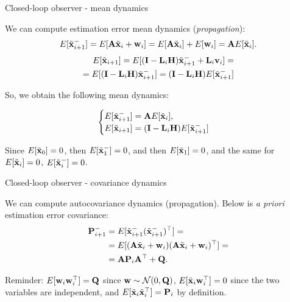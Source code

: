 \documentclass{beamer}
\begin{document}
\begin{frame}{Closed-loop observer - mean dynamics}
	\begin{flushleft}
		
		We can compute estimation error mean dynamics (\emph{propagation}):
				\begin{align*}
		E[\Tilde{\mathbf{x}}_{i+1}^-] = 
		E[\mathbf{A} \Tilde{\mathbf{x}}_i + \mathbf{w}_i] = 
		E[\mathbf{A} \Tilde{\mathbf{x}}_i] + E[\mathbf{w}_i]  =
		\mathbf{A}E[\Tilde{\mathbf{x}}_i].
				\end{align*}	
				\begin{align*}
		E[\Tilde{\mathbf{x}}_{i+1}] = 
		E[(\mathbf{I} - \mathbf{L}_i \mathbf{H}) \Tilde{\mathbf{x}}_{i+1}^- + \mathbf{L}_i\mathbf{v}_i] =\\
		=E[(\mathbf{I} - \mathbf{L}_i \mathbf{H}) \Tilde{\mathbf{x}}_{i+1}^-]
		= 
		(\mathbf{I} - \mathbf{L}_i \mathbf{H}) E[\Tilde{\mathbf{x}}_{i+1}^-]
				\end{align*}				
		
		So, we obtain the following mean dynamics:
		
				\begin{equation}
						\begin{cases}
								E[\Tilde{\mathbf{x}}_{i+1}^-] = \mathbf{A} E[\Tilde{\mathbf{x}}_i], \\
								E[\Tilde{\mathbf{x}}_{i+1}] = (\mathbf{I} - \mathbf{L}_i \mathbf{H}) E[\Tilde{\mathbf{x}}_{i+1}^-]
							\end{cases}
					\end{equation}		
		
		Since $E[\Tilde{\mathbf{x}}_0] = 0$, then $E[\Tilde{\mathbf{x}}_1^-] = 0$, and then $E[\Tilde{\mathbf{x}}_1] = 0$, and the same for $E[\Tilde{\mathbf{x}}_i] = 0$, $E[\Tilde{\mathbf{x}}_i^-] = 0$.
		
	\end{flushleft}
\end{frame}



\begin{frame}{Closed-loop observer - covariance dynamics}
	\begin{flushleft}
		
		We can compute autocovariance dynamics (propagation). Below is \emph{a priori} estimation error covariance:
		\begin{align*}
				\mathbf{P}_{i+1}^- 
				&= E[\Tilde{\mathbf{x}}_{i+1}^- (\Tilde{\mathbf{x}}_{i+1}^-)^\top] = \\
				&= E[ (\mathbf{A} \Tilde{\mathbf{x}}_i + \mathbf{w}_i) (\mathbf{A} \Tilde{\mathbf{x}}_i + \mathbf{w}_i)^\top] = \\
				&= \mathbf{A} \mathbf{P}_i \mathbf{A}^\top +\mathbf{Q}.
		\end{align*}		
	
		\bigskip
	
		\textcolor{mydarkgray}{Reminder: $E[\mathbf{w}_i \mathbf{w}_i^\top] = \mathbf{Q}$ since $\mathbf{w} \sim \mathcal{N} (0, \mathbf{Q})$, $E[\Tilde{\mathbf{x}}_i \mathbf{w}_i^\top] = 0$ since the two variables are independent, and $E[\Tilde{\mathbf{x}}_i \Tilde{\mathbf{x}}_i^\top] = \mathbf{P}_i$ by definition.}
		
		
	\end{flushleft}
\end{frame}
\end{document}
